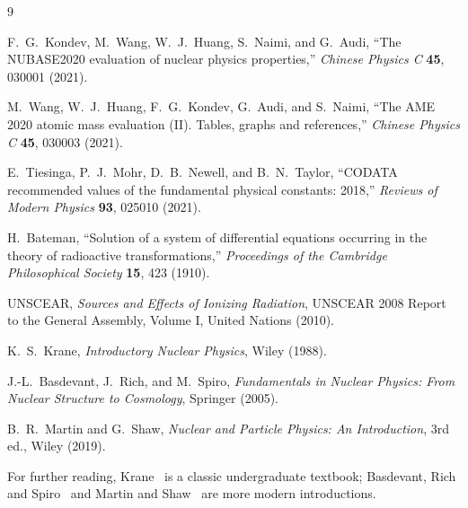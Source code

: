 \documentclass[11pt,a4paper]{article}
\begin{document}
\begin{thebibliography}{9}

F.~G.~Kondev, M.~Wang, W.~J.~Huang, S.~Naimi, and G.~Audi,
``The NUBASE2020 evaluation of nuclear physics properties,''
\emph{Chinese Physics C} \textbf{45}, 030001 (2021).

M.~Wang, W.~J.~Huang, F.~G.~Kondev, G.~Audi, and S.~Naimi,
``The AME 2020 atomic mass evaluation (II). Tables, graphs and references,''
\emph{Chinese Physics C} \textbf{45}, 030003 (2021).

E.~Tiesinga, P.~J.~Mohr, D.~B.~Newell, and B.~N.~Taylor,
``CODATA recommended values of the fundamental physical constants: 2018,''
\emph{Reviews of Modern Physics} \textbf{93}, 025010 (2021).

H.~Bateman,
``Solution of a system of differential equations occurring in the theory of radioactive transformations,''
\emph{Proceedings of the Cambridge Philosophical Society} \textbf{15}, 423 (1910).

UNSCEAR,
\emph{Sources and Effects of Ionizing Radiation}, UNSCEAR 2008 Report to the General Assembly, Volume I, United Nations (2010).

K.~S.~Krane,
\emph{Introductory Nuclear Physics}, Wiley (1988).

J.-L.~Basdevant, J.~Rich, and M.~Spiro,
\emph{Fundamentals in Nuclear Physics: From Nuclear Structure to Cosmology}, Springer (2005).

B.~R.~Martin and G.~Shaw,
\emph{Nuclear and Particle Physics: An Introduction}, 3rd ed., Wiley (2019).

\end{thebibliography}

\noindent For further reading, Krane~\cite{Krane} is a classic undergraduate textbook; Basdevant, Rich and Spiro~\cite{Basdevant} and Martin and Shaw~\cite{MartinShaw} are more modern introductions.
\end{document}
